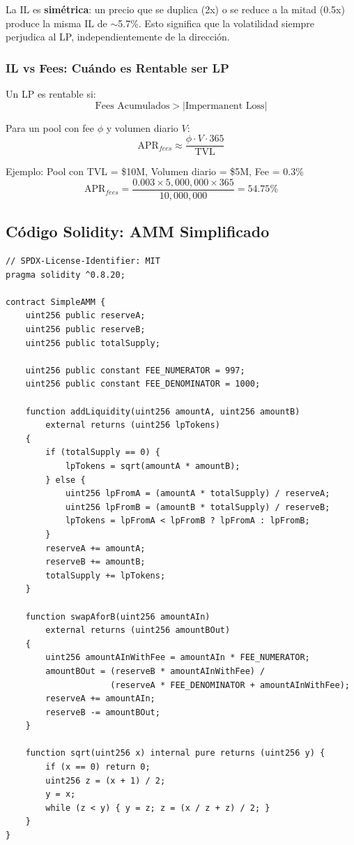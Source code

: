 \documentclass[11pt,a4paper,twoside]{book}
\begin{document}
\begin{remark}
La IL es \textbf{sim\'etrica}: un precio que se duplica (2x) o se reduce a la mitad (0.5x) produce la misma IL de $\sim$5.7\%. Esto significa que la volatilidad siempre perjudica al LP, independientemente de la direcci\'on.
\end{remark}

\subsubsection{IL vs Fees: Cu\'ando es Rentable ser LP}

\begin{keyidea}
Un LP es rentable si:
\[
\text{Fees Acumulados} > |\text{Impermanent Loss}|
\]

Para un pool con fee $\phi$ y volumen diario $V$:
\[
\text{APR}_{fees} \approx \frac{\phi \cdot V \cdot 365}{\text{TVL}}
\]

Ejemplo: Pool con TVL = \$10M, Volumen diario = \$5M, Fee = 0.3\%
\[
\text{APR}_{fees} = \frac{0.003 \times 5,000,000 \times 365}{10,000,000} = 54.75\%
\]
\end{keyidea}

\subsection{C\'odigo Solidity: AMM Simplificado}

\begin{example}
\begin{verbatim}
// SPDX-License-Identifier: MIT
pragma solidity ^0.8.20;

contract SimpleAMM {
    uint256 public reserveA;
    uint256 public reserveB;
    uint256 public totalSupply;
    
    uint256 public constant FEE_NUMERATOR = 997;
    uint256 public constant FEE_DENOMINATOR = 1000;
    
    function addLiquidity(uint256 amountA, uint256 amountB) 
        external returns (uint256 lpTokens) 
    {
        if (totalSupply == 0) {
            lpTokens = sqrt(amountA * amountB);
        } else {
            uint256 lpFromA = (amountA * totalSupply) / reserveA;
            uint256 lpFromB = (amountB * totalSupply) / reserveB;
            lpTokens = lpFromA < lpFromB ? lpFromA : lpFromB;
        }
        reserveA += amountA;
        reserveB += amountB;
        totalSupply += lpTokens;
    }
    
    function swapAforB(uint256 amountAIn) 
        external returns (uint256 amountBOut) 
    {
        uint256 amountAInWithFee = amountAIn * FEE_NUMERATOR;
        amountBOut = (reserveB * amountAInWithFee) / 
                     (reserveA * FEE_DENOMINATOR + amountAInWithFee);
        reserveA += amountAIn;
        reserveB -= amountBOut;
    }
    
    function sqrt(uint256 x) internal pure returns (uint256 y) {
        if (x == 0) return 0;
        uint256 z = (x + 1) / 2;
        y = x;
        while (z < y) { y = z; z = (x / z + z) / 2; }
    }
}
\end{verbatim}
\end{example}
\end{document}
